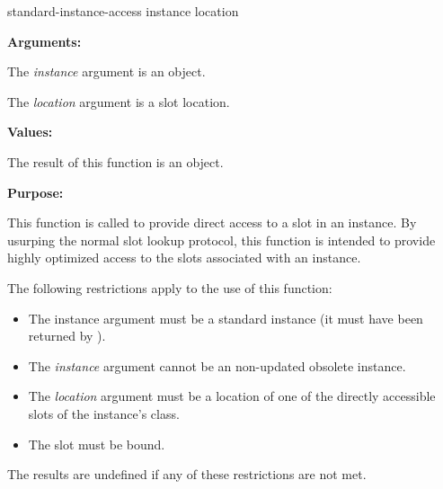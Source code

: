 \begin{defun}[Function]
standard-instance-access instance location

\textbf{Arguments:}

The \emph{instance} argument is an object.

The \emph{location} argument is a slot location.

\textbf{Values:}

The result of this function is an object.

\textbf{Purpose:}

This function is called to provide direct access to a slot in an instance. By
usurping the normal slot lookup protocol, this function is intended to provide
highly optimized access to the slots associated with an instance.

The following restrictions apply to the use of this function:

\begin{itemize}
\item The instance argument must be a standard instance (it must have been
  returned by ).

\item The \emph{instance} argument cannot be an non-updated obsolete instance.

\item The \emph{location} argument must be a location of one of the directly
  accessible slots of the instance's class.

\item The slot must be bound.
\end{itemize}

The results are undefined if any of these restrictions are not met.
\end{defun}

